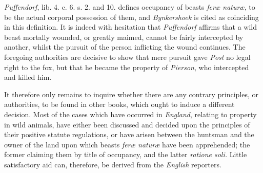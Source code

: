 \textit{Puffendorf}, lib. 4. c. 6. s. 2. and 10. defines occupancy of beasts
\textit{fer{\ae} natur{\ae}}, to be the actual corporal possession of them, and
\textit{Bynkershoek} is cited as coinciding in this definition. It is indeed
with hesitation that \textit{Puffendorf} affirms that a wild beast mortally
wounded, or greatly maimed, cannot be fairly intercepted by another, whilst the
pursuit of the person inflicting the wound continues. The foregoing authorities
are decisive to show that mere pursuit gave \textit{Post} no legal right to the
fox, but that he became the property of \textit{Pierson}, who intercepted and
killed him.

It therefore only remains to inquire whether there are any contrary principles,
or authorities, to be found in other books, which ought to induce a different
decision. Most of the cases which have occurred in \textit{England}, relating to
property in wild animals, have either been discussed and decided upon the
principles of their positive statute regulations, or have arisen between the
huntsman and the owner of the land upon which beasts \textit{fer{\ae}
natur{\ae}} have been apprehended; the former claiming them by title of
occupancy, and the latter \textit{ratione soli.} Little satisfactory aid can,
therefore, be derived from the \textit{English} reporters.

